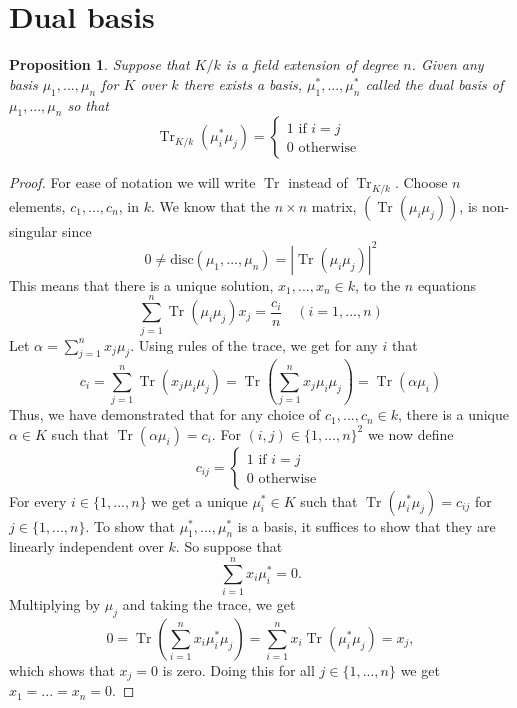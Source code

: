 \documentclass{article}
\DeclareMathOperator{\tr}{Tr}
\newtheorem{proposition}{Proposition}[section]
\numberwithin{equation}{section}
\begin{document}
\section{Dual basis}

\begin{proposition}\label{prop: Existence of dual basis}
    Suppose that $K/k$ is a field extension of degree $n$. Given any basis $\mu_1, ..., \mu_n$ for $K$ over $k$ there exists a basis, $\mu_1^*, ..., \mu_n^*$ called the dual basis of $\mu_1, ..., \mu_n$ so that
    $$\tr_{K/k}(\mu_i^* \mu_j) = \begin{cases*}
            1 \text{ if } i = j \\
            0 \text{ otherwise }
        \end{cases*}$$
\end{proposition}

\begin{proof}
    For ease of notation we will write $\tr$ instead of $\tr_{K/k}$. Choose $n$ elements, $c_1, ..., c_n$, in $k$. We know that the $n \times n$ matrix, $(\tr (\mu_i \mu_j))$, is non-singular since $$0 \neq \text{disc}(\mu_1, ..., \mu_n) = |\tr(\mu_i \mu_j)|^2$$
    This means that there is a unique solution, $x_1, ..., x_n \in k$, to the $n$ equations
    $$\sum_{j=1}^n \tr(\mu_i \mu_j) x_j = \frac{c_i}{n} \quad (i = 1, ..., n)$$
    Let $\alpha = \sum_{j=1}^n x_j \mu_j$. Using rules of the trace, we get for any $i$ that
    $$c_i = \sum_{j=1}^n \tr(x_j \mu_i \mu_j) = \tr(\sum_{j=1}^n x_j \mu_i \mu_j) = \tr(\alpha \mu_i)$$
    Thus, we have demonstrated that for any choice of $c_1, ..., c_n \in k$, there is a unique $\alpha \in K$ such that $\tr(\alpha \mu_i)= c_i$. For $(i,j) \in \{1, ..., n\}^2$ we now define
    $$c_{ij} = \begin{cases*}
            1 \text{ if } i = j \\
            0 \text{ otherwise }
        \end{cases*}$$
    For every $i \in \{1, ..., n \}$ we get a unique $\mu_i^* \in K$ such that $\tr(\mu_i^* \mu_j) = c_{ij}$ for $j \in \{ 1, ..., n \}$. To show that $\mu_1^*, ..., \mu_n^*$ is a basis, it suffices to show that they are linearly independent over $k$. So suppose that
    $$\sum_{i=1}^n x_i \mu_i^* = 0.$$
    Multiplying by $\mu_j$ and taking the trace, we get
    $$0 = \tr(\sum_{i=1}^n x_i \mu_i^* \mu_j) = \sum_{i=1}^n x_i \tr(\mu_i^* \mu_j) = x_j,$$
    which shows that $x_j = 0$ is zero. Doing this for all $j \in \{1, ..., n \}$ we get $x_1 = ... = x_n = 0$.
\end{proof}
\end{document}
